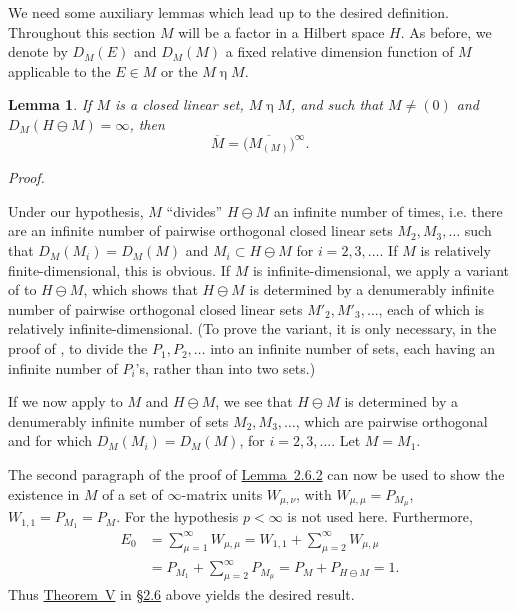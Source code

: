 \documentclass[b5paper,twoside]{article}
\newcommand{\secref}[2]{\hyperref[#1]{\mbox{\S#2}}}
\newcommand{\thmref}[2]{\hyperref[#1]{\mbox{Theorem~#2}}}
\newcommand{\lemref}[2]{\hyperref[#1]{\mbox{Lemma~#2}}}
\theoremstyle{mvnplain}
\newtheorem{lemma}{Lemma}[section]
\renewenvironment{proof}[1][Proof]{%
  \par\addvspace{0.35\baselineskip}%
  \noindent\textit{#1.}\ \normalfont\ignorespaces
}{%
  \par\addvspace{0.35\baselineskip}%
}
\newcommand{\M}{\mathbf M}
\newcommand{\Hilbert}{\mathfrak H}
\def\M{M}%
\def\Hilbert{H}%
\def\mathfrak#1{#1}%
\begin{document}
We need some auxiliary lemmas which lead up to the desired definition.
Throughout this section \(\M\) will be a factor in a Hilbert space \(\Hilbert\).
As before, we denote by \(D_{\M}(E)\) and \(D_{\M}(\mathfrak M)\) a fixed
relative dimension function of \(\M\) applicable to the \(E\in\M\) or the
\(\mathfrak M\mathrel{\eta}\M\).

\begin{lemma}\label{lem:3.1.1}
If \(\mathfrak M\) is a closed linear set, \(\mathfrak M\mathrel{\eta}\M\), and such
that \(\mathfrak M\ne(0)\) and
\(D_{\M}(\Hilbert\ominus\mathfrak M)=\infty\), then
\[
  \overline{\M}=\bigl(\overline{\M_{(\mathfrak M)}}\bigr)^{\infty}.
\]
\end{lemma}

\begin{proof}
Under our hypothesis, \(\mathfrak M\) ``divides''
\(\Hilbert\ominus\mathfrak M\) an infinite number of times, i.e. there are an
infinite number of pairwise orthogonal closed linear sets
\(\mathfrak M_2,\mathfrak M_3,\ldots\) such that
\(D_{\M}(\mathfrak M_i)=D_{\M}(\mathfrak M)\) and
\(\mathfrak M_i\subset\Hilbert\ominus\mathfrak M\) for
\(i=2,3,\ldots\). If \(\mathfrak M\) is relatively finite-dimensional, this is
obvious. If \(\mathfrak M\) is infinite-dimensional, we apply a variant of
\cite[p.~157, Lemma~7.2.3]{ref5} to \(\Hilbert\ominus\mathfrak M\), which
shows that \(\Hilbert\ominus\mathfrak M\) is determined by a denumerably
infinite number of pairwise orthogonal closed linear sets
\(\mathfrak M'_2,\mathfrak M'_3,\ldots\), each of which is relatively
infinite-dimensional. (To prove the variant, it is only necessary, in the proof
of \cite[Lemma~7.2.3]{ref5}, to divide the
\(\mathfrak P_1,\mathfrak P_2,\ldots\) into an infinite number of sets, each
having an infinite number of \(\mathfrak P_i\)'s, rather than into two sets.)

If we now apply \cite[p.~155, Lemma~7.1.2]{ref5} to \(\mathfrak M\) and
\(\Hilbert\ominus\mathfrak M\), we see that
\(\Hilbert\ominus\mathfrak M\) is determined by a denumerably infinite
number of sets \(\mathfrak M_2,\mathfrak M_3,\ldots\), which are pairwise
orthogonal and for which
\(D_{\M}(\mathfrak M_i)=D_{\M}(\mathfrak M)\), for
\(i=2,3,\ldots\). Let \(\mathfrak M=\mathfrak M_1\).

The second paragraph of the proof of \lemref{lem:2.6.2}{2.6.2} can now be
used to show the existence in \(\M\) of a set of \(\infty\)-matrix units
\(W_{\mu,\nu}\), with
\(W_{\mu,\mu}=P_{\mathfrak M_\mu}\),
\(W_{1,1}=P_{\mathfrak M_1}=P_{\mathfrak M}\). For the hypothesis
\(p<\infty\) is not used here. Furthermore,
\[
\begin{aligned}
E_0&=\sum_{\mu=1}^{\infty}W_{\mu,\mu}
 =W_{1,1}+\sum_{\mu=2}^{\infty}W_{\mu,\mu}\\
&=P_{\mathfrak M_1}+\sum_{\mu=2}^{\infty}P_{\mathfrak M_\mu}
 =P_{\mathfrak M}+P_{\Hilbert\ominus\mathfrak M}=1.
\end{aligned}
\]
Thus \thmref{thm:V}{V} in \secref{sec:2.6}{2.6} above yields the desired
result.
\end{proof}
\end{document}
